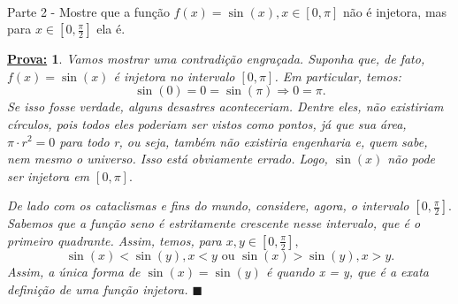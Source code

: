 \documentclass{article}
\newtheorem*{proof*}{\underline{Prova:}}
\renewcommand\qedsymbol{$\blacksquare$}
\begin{document}
\paragraph{}Parte 2 - Mostre que a fun\c c\~ao $f(x) = \sin(x), x\in[0, \pi]$ n\~ao \'e injetora, mas para $x\in[0, \frac{\pi}{2}]$ ela \'e.
\begin{proof*}
	Vamos mostrar uma contradi\c c\~ao engra\c cada. Suponha que, de fato, $f(x) = \sin(x)$ \'e injetora no intervalo $[0, \pi]$. Em particular, temos:
	$$
		\sin(0) = 0 = \sin(\pi) \Rightarrow 0 = \pi.
	$$
	Se isso fosse verdade, alguns desastres aconteceriam. Dentre eles, n\~ao existiriam c\'irculos, pois todos eles poderiam ser vistos como pontos, j\'a que sua \'area, $\pi\cdot{r^2} = 0$ para todo r, ou seja, tamb\'em n\~ao existiria engenharia e, quem sabe, nem mesmo o universo. Isso est\'a obviamente errado. Logo, $\sin(x)$ n\~ao pode ser injetora em $[0, \pi].$

	De lado com os cataclismas e fins do mundo, considere, agora, o intervalo $[0, \frac{\pi}{2}].$ Sabemos que a fun\c c\~ao seno \'e estritamente crescente nesse intervalo, que \'e o primeiro quadrante. Assim, temos, para $x, y\in[0, \frac{\pi}{2}],$
	$$
		\sin(x) < \sin(y), x < y \text{ ou } \sin(x) > \sin(y), x > y.
	$$
	Assim, a \'unica forma de $\sin(x) = \sin(y)$ \'e quando x = y, que \'e a exata defini\c c\~ao de uma fun\c c\~ao injetora.
	\qedsymbol
\end{proof*}
\end{document}
